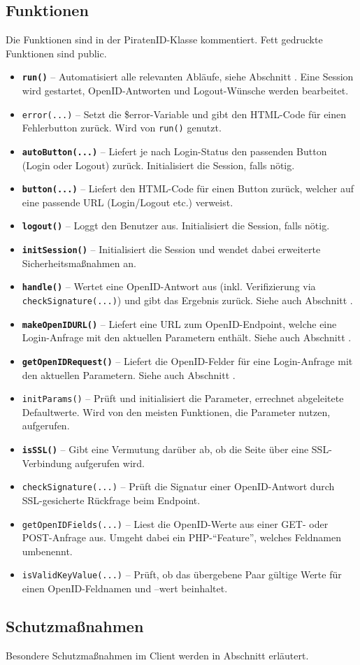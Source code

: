 \subsection{Funktionen}
Die Funktionen sind in der PiratenID-Klasse kommentiert. Fett gedruckte Funktionen sind public.
\begin{itemize}
	\item \textbf{\texttt{run()}} --
		Automatisiert alle relevanten Abläufe, siehe Abschnitt .
		Eine Session wird gestartet, OpenID-Antworten und Logout-Wünsche werden bearbeitet.
	\item \texttt{error(...)} --
		Setzt die \$error-Variable und gibt den HTML-Code für einen Fehlerbutton zurück. Wird von \texttt{run()} genutzt.
	\item \textbf{\texttt{autoButton(...)}} --
		Liefert je nach Login-Status den passenden Button (Login oder Logout) zurück. Initialisiert die Session, falls nötig.
	\item \textbf{\texttt{button(...)}} --
		Liefert den HTML-Code für einen Button zurück, welcher auf eine passende URL (Login/Logout etc.) verweist.
	\item \textbf{\texttt{logout()}} --
		Loggt den Benutzer aus. Initialisiert die Session, falls nötig.
	\item \textbf{\texttt{initSession()}} --
		Initialisiert die Session und wendet dabei erweiterte Sicherheitsmaßnahmen an.
	\item \textbf{\texttt{handle()}} --
		Wertet eine OpenID-Antwort aus (inkl. Verifizierung via \texttt{checkSignature(...)}) und gibt das Ergebnis zurück.
		Siehe auch Abschnitt  .
	\item \textbf{\texttt{makeOpenIDURL()}} --
		Liefert eine URL zum OpenID-Endpoint, welche eine Login-Anfrage mit den aktuellen Parametern enthält.
		Siehe auch Abschnitt  .
	\item \textbf{\texttt{getOpenIDRequest()}} --
		Liefert die OpenID-Felder für eine Login-Anfrage mit den aktuellen Parametern.
		Siehe auch Abschnitt  .
	\item \texttt{initParams()} --
		Prüft und initialisiert die Parameter, errechnet abgeleitete Defaultwerte.
		Wird von den meisten Funktionen, die Parameter nutzen, aufgerufen.
	\item \textbf{\texttt{isSSL()}} --
		Gibt eine Vermutung darüber ab, ob die Seite über eine SSL-Verbindung aufgerufen wird.
	\item \texttt{checkSignature(...)} --
		Prüft die Signatur einer OpenID-Antwort durch SSL-gesicherte Rückfrage beim Endpoint.
	\item \texttt{getOpenIDFields(...)} -- 
		Liest die OpenID-Werte aus einer GET- oder POST-Anfrage aus. Umgeht dabei ein PHP-"`Feature"', welches Feldnamen umbenennt.
	\item \texttt{isValidKeyValue(...)} -- 
		Prüft, ob das übergebene Paar gültige Werte für einen OpenID-Feldnamen und --wert beinhaltet.
	

\end{itemize}

\subsection{Schutzmaßnahmen}
Besondere Schutzmaßnahmen im Client werden in Abschnitt  erläutert.






